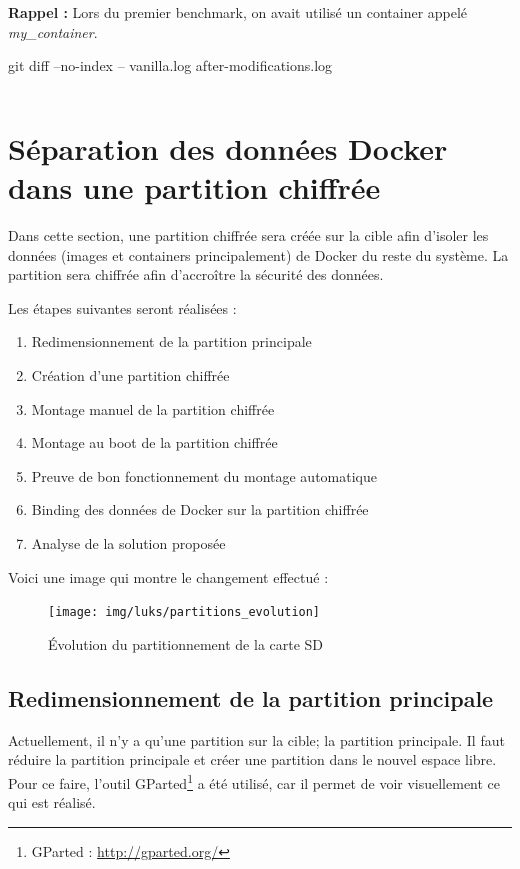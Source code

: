 \documentclass[11pt,a4paper,oneside]{report}
\begin{document}
\textbf{Rappel :} Lors du premier benchmark, on avait utilisé un container appelé \textit{my\_container}.

\begin{bashcode}
git diff --no-index -- vanilla.log after-modifications.log
\end{bashcode}

\inputminted[xleftmargin=20pt, linenos=true, breaklines=true, frame=single, framesep=6pt, tabsize=2, fontfamily=courier, fontsize=\small]{diff}{../../docker_security_benchmark/diff.log}


\section{Séparation des données Docker dans une partition chiffrée}\label{partition_chiffree}
Dans cette section, une partition chiffrée sera créée sur la cible afin d'isoler les données (images et containers principalement) de Docker du reste du système. La partition sera chiffrée afin d'accroître la sécurité des données.

Les étapes suivantes seront réalisées :
\begin{enumerate}
\item Redimensionnement de la partition principale
\item Création d'une partition chiffrée
\item Montage manuel de la partition chiffrée
\item Montage au boot de la partition chiffrée
\item Preuve de bon fonctionnement du montage automatique
\item Binding des données de Docker sur la partition chiffrée
\item Analyse de la solution proposée
\end{enumerate}

Voici une image qui montre le changement effectué :
\begin{figure}[H]
\centering
\texttt{[image: img/luks/partitions\_evolution]}
\caption{Évolution du partitionnement de la carte SD}
\end{figure}


\subsection{Redimensionnement de la partition principale}
Actuellement, il n'y a qu'une partition sur la cible; la partition principale. Il faut réduire la partition principale et créer une partition dans le nouvel espace libre. Pour ce faire, l'outil GParted\footnote{GParted : \url{http://gparted.org/}} a été utilisé, car il permet de voir visuellement ce qui est réalisé.
\end{document}

